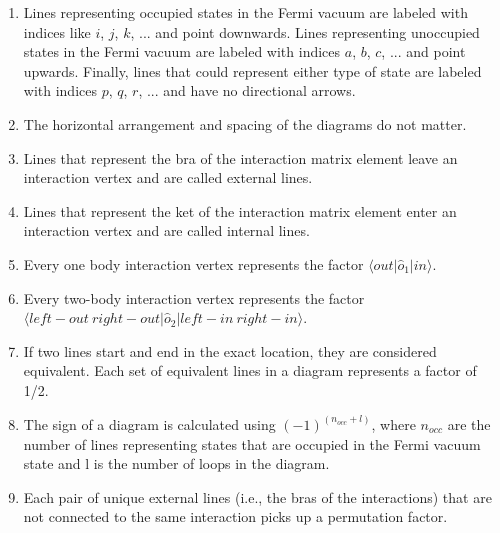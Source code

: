\begin{enumerate}
    \item Lines representing occupied states in the Fermi vacuum are labeled with indices like $i$, $j$, $k$, ... and point downwards. Lines representing unoccupied states in the Fermi vacuum are labeled with indices $a$, $b$, $c$, ... and point upwards. Finally, lines that could represent either type of state are labeled with indices $p$, $q$, $r$, ... and have no directional arrows.
    \item The horizontal arrangement and spacing of the diagrams do not matter.
    \item Lines that represent the bra of the interaction matrix element leave an interaction vertex and are called external lines.
    \item Lines that represent the ket of the interaction matrix element enter an interaction vertex and are called internal lines.
    \item Every one body interaction vertex represents the factor $\langle out | \hat{o}_1 | in \rangle$.
    \item Every two-body interaction vertex represents the factor $\langle left-out\ right-out | \hat{o}_2 | left-in\ right-in \rangle$.
    \item If two lines start and end in the exact location, they are considered equivalent. Each set of equivalent lines in a diagram represents a factor of 1/2.
    \item The sign of a diagram is calculated using $(-1)^{(n_{occ} + l)}$, where $n_{occ}$ are the number of lines representing states that are occupied in the Fermi vacuum state and l is the number of loops in the diagram.
    \item Each pair of unique external lines (i.e., the bras of the interactions) that are not connected to the same interaction picks up a permutation factor.
\end{enumerate}
